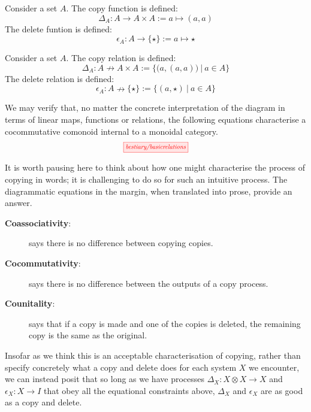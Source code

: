 \begin{example}
Consider a set $A$. The copy function is defined:
\[\Delta_A : A \rightarrow A \times A := a \mapsto (a,a)\]
The delete funtion is defined:
\[\epsilon_A : A \rightarrow \{\star\} := a \mapsto \star\]
\end{example}

\begin{example}\label{relcopy}
Consider a set $A$. The copy relation is defined:
\[\Delta_A : A \nrightarrow A \times A := \{\big(a , (a,a) \big) \ | \ a \in A\}\]
The delete relation is defined:
\[\epsilon_A : A \nrightarrow \{\star\} := \{(a,\star) \ | \ a \in A\}\]
\end{example}

We may verify that, no matter the concrete interpretation of the diagram in terms of linear maps, functions or relations, the following equations characterise a cocommutative comonoid internal to a monoidal category.
\begin{equation}\label{cocom}
\scalebox{0.75}{\tikzfig{bestiary/basicrelations}}
\end{equation}

It is worth pausing here to think about how one might characterise the process of copying in words; it is challenging to do so for such an intuitive process. The diagrammatic equations in the margin, when translated into prose, provide an answer.
\begin{description}
\item[\textbf{Coassociativity}:] says there is no difference between copying copies.
\item[\textbf{Cocommutativity}:] says there is no difference between the outputs of a copy process.
\item[\textbf{Counitality}:] says that if a copy is made and one of the copies is deleted, the remaining copy is the same as the original.
\end{description}

Insofar as we think this is an acceptable characterisation of copying, rather than specify concretely what a copy and delete does for each system $X$ we encounter, we can instead posit that so long as we have processes $\Delta_X: X \otimes X \rightarrow X$ and $\epsilon_X: X \rightarrow I$ that obey all the equational constraints above, $\Delta_X$ and $\epsilon_X$ are as good as a copy and delete.

